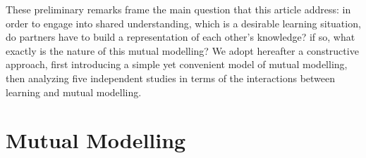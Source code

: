 \documentclass[twocolumn]{article}
\begin{document}
%
%
%

\vspace{2em}
These preliminary remarks frame the main question that this article address:
in order to engage into shared understanding, which is a desirable learning
situation, do partners have to build a representation of each other's knowledge?
if so, what exactly is the nature of this mutual modelling? We adopt hereafter a
constructive approach, first introducing a simple yet convenient model of mutual
modelling, then analyzing five independent studies in terms of the interactions
between learning and mutual modelling.

\section{Mutual Modelling}
\end{document}

